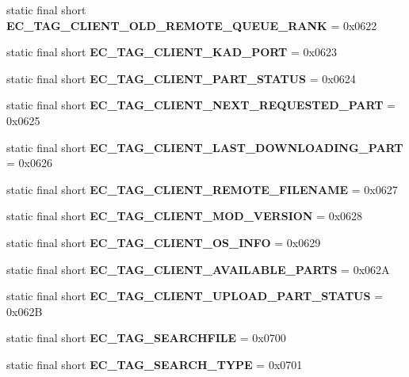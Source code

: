 \begin{DoxyCompactItemize}
\item 
static final short {\bfseries EC\_\-TAG\_\-CLIENT\_\-OLD\_\-REMOTE\_\-QUEUE\_\-RANK} = 0x0622\label{interfaceECCodes_aa53257843eb9b73649be65d9c1cdf2d3}

\item 
static final short {\bfseries EC\_\-TAG\_\-CLIENT\_\-KAD\_\-PORT} = 0x0623\label{interfaceECCodes_afb3f2c7798a9649ce9d02f3cdc497621}

\item 
static final short {\bfseries EC\_\-TAG\_\-CLIENT\_\-PART\_\-STATUS} = 0x0624\label{interfaceECCodes_af5e4816c1861b08b0dfaa969cbfea210}

\item 
static final short {\bfseries EC\_\-TAG\_\-CLIENT\_\-NEXT\_\-REQUESTED\_\-PART} = 0x0625\label{interfaceECCodes_ab08df8335f6d96198c304fc2cbe80dc0}

\item 
static final short {\bfseries EC\_\-TAG\_\-CLIENT\_\-LAST\_\-DOWNLOADING\_\-PART} = 0x0626\label{interfaceECCodes_a84b831a5fbfd67de5775e7c91b7f3c4e}

\item 
static final short {\bfseries EC\_\-TAG\_\-CLIENT\_\-REMOTE\_\-FILENAME} = 0x0627\label{interfaceECCodes_a992930cf894049577e9aaca4906327c8}

\item 
static final short {\bfseries EC\_\-TAG\_\-CLIENT\_\-MOD\_\-VERSION} = 0x0628\label{interfaceECCodes_a485b82b11166f3da0d8e891491b234f4}

\item 
static final short {\bfseries EC\_\-TAG\_\-CLIENT\_\-OS\_\-INFO} = 0x0629\label{interfaceECCodes_a8ee2d067ffc9b0657b11fcaba6a1c7aa}

\item 
static final short {\bfseries EC\_\-TAG\_\-CLIENT\_\-AVAILABLE\_\-PARTS} = 0x062A\label{interfaceECCodes_ad9254d536b8d7361a306bc154de2b5f8}

\item 
static final short {\bfseries EC\_\-TAG\_\-CLIENT\_\-UPLOAD\_\-PART\_\-STATUS} = 0x062B\label{interfaceECCodes_ac5a940a85a5418a3adc5fabe6fdbb234}

\item 
static final short {\bfseries EC\_\-TAG\_\-SEARCHFILE} = 0x0700\label{interfaceECCodes_a9aaee89583e0a8d8e45ae419724bc1a4}

\item 
static final short {\bfseries EC\_\-TAG\_\-SEARCH\_\-TYPE} = 0x0701\label{interfaceECCodes_aee8a98e64f1cc6a3c17a4a564b0aafb3}


\end{DoxyCompactItemize}
